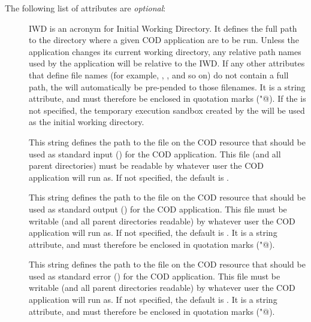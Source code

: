 
The following list of attributes are \emph{optional}:

\begin{description}

 \item[] IWD is an acronym for Initial Working Directory.
   It defines the full path to the directory where a given COD
   application are to be run.
   Unless the application changes its current working directory, any
   relative path names used by the application will be relative to
   the IWD.
   If any other attributes that define file names (for example,
   , , and so on) do not contain a full path, the
    will automatically be pre-pended to those filenames.
   It is a string attribute, and must therefore be enclosed in 
   quotation marks (\verb@"@).
   If the  is not specified, the temporary execution sandbox
   created by the  will be used as the initial working
   directory.

 \item[] This string defines the path to the file on the
   COD resource that should be used as standard input () for 
   the COD application.
   This file (and all parent directories) must be readable by whatever
   user the COD application will run as.
   If not specified, the default is .
 
 \item[] This string defines the path to the file on the
   COD resource that should be used as standard output ()
   for the COD application.
   This file must be writable (and all parent directories readable) by
   whatever user the COD application will run as.
   If not specified, the default is .
   It is a string attribute, and must therefore be enclosed in 
   quotation marks (\verb@"@).
 
 \item[] This string defines the path to the file on the
   COD resource that should be used as standard error ()
   for the COD application.
   This file must be writable (and all parent directories readable) by
   whatever user the COD application will run as.
   If not specified, the default is .
   It is a string attribute, and must therefore be enclosed in 
   quotation marks (\verb@"@).


\end{description}
